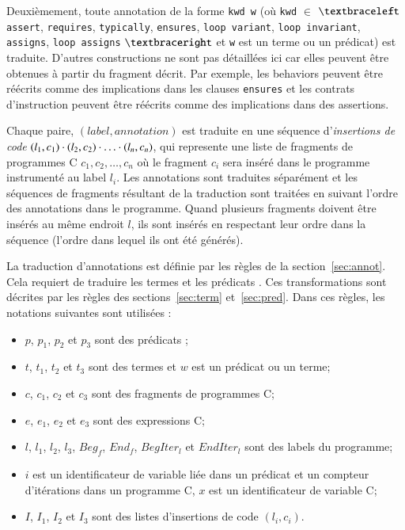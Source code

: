 Deuxièmement, toute annotation \eacsl de la forme \lstinline'kwd w' (où
\lstinline'kwd' $\in$ $\bopen$ \lstinline|assert|, \lstinline|requires|,
\lstinline|typically|, \lstinline|ensures|, \lstinline|loop variant|,
\lstinline|loop invariant|, \lstinline|assigns|, \lstinline|loop assigns|
$\bclose$ et \lstinline'w' est un terme ou un prédicat) est traduite.
D'autres constructions \eacsl ne sont pas détaillées ici car elles peuvent être
obtenues à partir du fragment \eacsl décrit.
Par exemple, les behaviors peuvent être réécrits comme des implications dans les
clauses \lstinline'ensures' et les contrats d'instruction peuvent être réécrits
comme des implications dans des assertions.

Chaque paire, $(label, annotation)$ est traduite en une séquence
d'\emph{insertions de code}
$(l_1, c_1) \cdot (l_2, c_2) \cdot \ldots \cdot (l_n, c_n)$, qui 
represente une liste de fragments de programmes C $c_1, c_2, \ldots, c_n$ où
le fragment $c_i$ sera inséré dans le programme instrumenté au label $l_i$.
Les annotations \eacsl sont traduites séparément et les séquences de fragments
résultant de la traduction sont traitées en suivant l'ordre des annotations dans
le programme.
Quand plusieurs fragments doivent être insérés au même endroit $l$, ils sont
insérés en respectant leur ordre dans la séquence (l'ordre dans lequel ils ont
été générés).

La traduction d'annotations est définie par les règles de la
section~\ref{sec:annot}.
Cela requiert de traduire les termes et les prédicats \eacsl.
Ces transformations sont décrites par les règles des sections~\ref{sec:term}
et~\ref{sec:pred}.
Dans ces règles, les notations suivantes sont utilisées :
\begin{itemize}
\item $p$, $p_1$, $p_2$ et $p_3$ sont des prédicats \eacsl;
\item $t$, $t_1$, $t_2$ et $t_3$ sont des termes \eacsl et $w$ est un prédicat
  ou un terme;
\item $c$, $c_1$, $c_2$ et $c_3$ sont des fragments de programmes C;
\item $e$, $e_1$, $e_2$ et $e_3$ sont des expressions C;
\item $l$, $l_1$, $l_2$, $l_3$, $Beg_f$, $End_f$, $BegIter_l$ et $EndIter_l$ sont
  des labels du programme;
\item $i$ est un identificateur de variable liée dans un prédicat \eacsl et un
  compteur d'itérations dans un programme C, $x$ est un identificateur de
  variable C;
\item $I$, $I_1$, $I_2$ et $I_3$ sont des listes d'insertions de code
  $(l_i, c_i)$.
\end{itemize}


